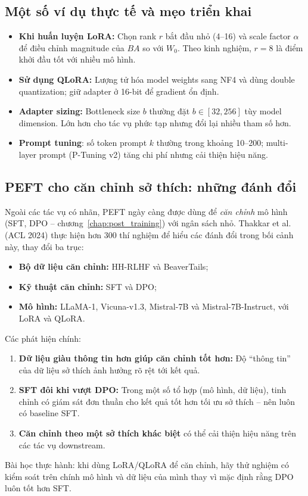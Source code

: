 \subsection{Một số ví dụ thực tế và mẹo triển khai}
\label{ssec:practical}
\begin{itemize}
	\item \textbf{Khi huấn luyện LoRA:} Chọn rank $r$ bắt đầu nhỏ (4--16) và scale factor $\alpha$ để điều chỉnh magnitude của $BA$ so với $W_0$. Theo kinh nghiệm, $r=8$ là điểm khởi đầu tốt với nhiều mô hình.
	\item \textbf{Sử dụng QLoRA:} Lượng tử hóa model weights sang NF4 và dùng double quantization; giữ adapter ở 16-bit để gradient ổn định.
	\item \textbf{Adapter sizing:} Bottleneck size $b$ thường đặt $b \in [32,256]$ tùy model dimension. Lớn hơn cho tác vụ phức tạp nhưng đổi lại nhiều tham số hơn.
	\item \textbf{Prompt tuning}: số token prompt $k$ thường trong khoảng 10--200; multi-layer prompt (P-Tuning v2) tăng chi phí nhưng cải thiện hiệu năng.
\end{itemize}

\subsection{PEFT cho căn chỉnh sở thích: những đánh đổi}
\label{ssec:peft_alignment_tradeoffs}
Ngoài các tác vụ có nhãn, PEFT ngày càng được dùng để \emph{căn chỉnh} mô hình (SFT, DPO -- chương~\ref{chap:post_training}) với ngân sách nhỏ. Thakkar et al. (ACL 2024) \cite{thakkar2024deepdive} thực hiện hơn 300 thí nghiệm để hiểu các đánh đổi trong bối cảnh này, thay đổi ba trục:
\begin{itemize}
	\item \textbf{Bộ dữ liệu căn chỉnh:} HH-RLHF và BeaverTails;
	\item \textbf{Kỹ thuật căn chỉnh:} SFT và DPO;
	\item \textbf{Mô hình:} LLaMA-1, Vicuna-v1.3, Mistral-7B và Mistral-7B-Instruct, với LoRA và QLoRA.
\end{itemize}
Các phát hiện chính:
\begin{enumerate}
	\item \textbf{Dữ liệu giàu thông tin hơn giúp căn chỉnh tốt hơn:} Độ “thông tin” của dữ liệu sở thích ảnh hưởng rõ rệt tới kết quả.
	\item \textbf{SFT đôi khi vượt DPO:} Trong một số tổ hợp (mô hình, dữ liệu), tinh chỉnh có giám sát đơn thuần cho kết quả tốt hơn tối ưu sở thích -- nên luôn có baseline SFT.
	\item \textbf{Căn chỉnh theo một sở thích khác biệt} có thể cải thiện hiệu năng trên các tác vụ downstream.
\end{enumerate}
Bài học thực hành: khi dùng LoRA/QLoRA để căn chỉnh, hãy thử nghiệm có kiểm soát trên chính mô hình và dữ liệu của mình thay vì mặc định rằng DPO luôn tốt hơn SFT.

